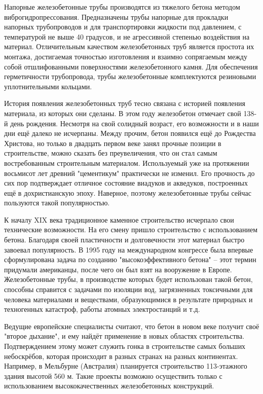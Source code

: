 \documentclass[a4paper,12pt,russian]{report}
\begin{document}
Напорные железобетонные трубы производятся из тяжелого бетона методом виброгидропрессования. Предназначены трубы напорные для прокладки напорных трубопроводов и для транспортировки жидкости под давлением, с температурой не выше 40 градусов, и не агрессивной степенью воздействия на материал. Отличительным качеством железобетонных труб является простота их монтажа, достигаемая точностью изготовления и взаимно сопрягаемым между собой отшлифованными поверхностями железобетонного камня. Для обеспечения герметичности трубопровода, трубы железобетонные комплектуются резиновыми уплотнительными кольцами.

История появления железобетонных труб тесно связана с историей появления материала, из которых они сделаны. В этом году железобетон отмечает свой 138-й день рождения. Несмотря на свой солидный возраст, его возможности и в наши дни ещё далеко не исчерпаны. Между прочим, бетон появился ещё до Рождества Христова, но только в двадцать первом веке занял прочные позиции в строительстве, можно сказать без преувеличения, что он стал самым востребованным строительным материалом. Используемый уже на протяжении восьмисот лет древний "цементикум" практически не изменил. Его прочность до сих пор подтверждает отличное состояние виадуков и акведуков, построенных ещё в дохристианскую эпоху. Наверное, поэтому железобетонные трубы сейчас пользуются такой популярностью.

К началу XIX века традиционное каменное строительство исчерпало свои технические возможности. На его смену пришло строительство с использованием бетона. Благодаря своей пластичности и долговечности этот материал быстро завоевал популярность. В 1995 году на международном конгрессе была впервые сформулирована задача по созданию "высокоэффективного бетона" – этот термин придумали американцы, после чего он был взят на вооружение в Европе. Железобетонные трубы, в производстве которых будет использован такой бетон, способны справится с задачами по изоляции вод, загрязненных токсичными для человека материалами и веществами, образующимися в результате природных и техногенных катастроф, работы атомных электростанций и т.д.

Ведущие европейские специалисты считают, что бетон в новом веке получит своё "второе дыхание", и ему найдёт применение в новых областях строительства. Подтверждением этому может служить гонка в строительстве самых больших небоскрёбов, которая происходит в разных странах на разных континентах. Например, в Мельбурне (Австралия) планируется строительство 113-этажного здания высотой 560 м. Такие проекты возможно осуществить только с использованием высококачественных железобетонных конструкций.
\end{document}
